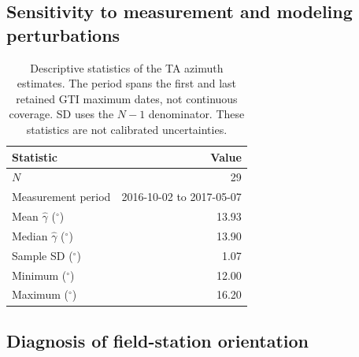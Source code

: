 
\subsection{Sensitivity to measurement and modeling perturbations}
\label{subsec:sensitivity}

\begin{table}[htbp]
	\centering
	\small
	\caption{Descriptive statistics of the TA azimuth estimates. The period spans the first and last retained GTI maximum dates, not continuous coverage. SD uses the $N-1$ denominator. These statistics are not calibrated uncertainties.}
	\label{tab:ta-descriptive}
	\begin{tabular}{lr}
		\toprule
		Statistic & Value \\
		\midrule
		$N$ & 29 \\
		Measurement period & 2016-10-02 to 2017-05-07 \\
		Mean $\hat{\gamma}$ ($^\circ$) & 13.93 \\
		Median $\hat{\gamma}$ ($^\circ$) & 13.90 \\
		Sample SD ($^\circ$) & 1.07 \\
		Minimum ($^\circ$) & 12.00 \\
		Maximum ($^\circ$) & 16.20 \\
		\bottomrule
	\end{tabular}
\end{table}

\subsection{Diagnosis of field-station orientation}
\label{subsec:fieldresults}


